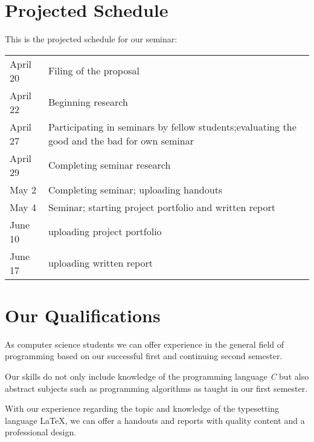 \section*{Projected Schedule}
This is the projected schedule for our seminar:\\
\begin{tabular}{L{0.15} L{0.7}}
April 20 & Filing of the proposal\\
April 22 & Beginning research\\
April 27 \newline & Participating in seminars by fellow students;\newline evaluating the good and the bad for own seminar\\
April 29 & Completing seminar research\\
May 2 & Completing seminar; uploading handouts\\
May 4 & Seminar; starting project portfolio and written report\\
June 10 & uploading project portfolio\\
June 17 & uploading written report
\end{tabular}
\section*{Our Qualifications}
As computer science students we can offer experience in the general field of programming based on our successful first and continuing second semester.

Our skills do not only include knowledge of the programming language \emph{C} but also abstract subjects such as programming algorithms as taught in our first semester.

With our experience regarding the topic and knowledge of the typesetting language \LaTeX, we can offer a handouts and reports with quality content and a professional design.
 
